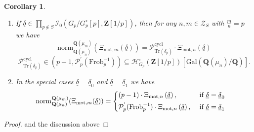 \documentclass{amsart}%
\theoremstyle{plain}
\newtheorem{cor}[thm]{Corollary}
\theoremstyle{plain}
\theoremstyle{remark}
\begin{document}
\begin{cor}\label{cor base change}
\begin{enumerate}
\item If $\underline{\delta}\in\prod_{p\notin S}\mathcal{I}_0(G_p/G_p^\circ[p],\mathbf{Z}[1/p])$, then for any $n,m\in\mathscr{Z}_S$ with $\tfrac{m}{n}=p$ we have
$$
    \mathrm{norm}^{\mathbf{Q}(\mu_m)}_{\mathbf{Q}(\mu_n)}\left(\Xi_{\mathrm{mot},m}(\underline{\delta})\right)=\mathcal{P}_{\mathrm{Tr}(\delta_p)}^\mathrm{cycl}\cdot \Xi_{\mathrm{mot},n}(\underline{\delta})$$
     $$\mathcal{P}_{\mathrm{Tr}(\delta_p)}^\mathrm{cycl}\in \left(p-1,\mathcal{P}_p^{'}\left(\mathrm{Frob}_p^{-1}\right)\right)\subseteq \mathcal{H}_{G_p}^\circ(\mathbf{Z}[1/p])[\mathrm{Gal}(\mathbf{Q}(\mu_n)/\mathbf{Q})].$$
\item In the special cases $\underline{\delta}=\underline{\delta}_0$ and $\underline{\delta}=\underline{\delta}_1$ we have
\begin{align*}
    \mathrm{norm}^{\mathbf{Q}(\mu_m)}_{\mathbf{Q}(\mu_n)}(\Xi_{\mathrm{mot},m}(\underline{\delta}))&=\begin{dcases}
        (p-1)\cdot \Xi_{\mathrm{mot},n}\left(\underline{\delta}\right),\ &\text{if}\ \underline{\delta}=\underline{\delta}_0\\
        \mathcal{P}_p^{'}(\mathrm{Frob}_p^{-1})\cdot \Xi_{\mathrm{mot},n}\left(\underline{\delta}\right),\ &\text{if}\ \underline{\delta}=\underline{\delta}_1
    \end{dcases}
\end{align*} 
\end{enumerate}
\end{cor}
\begin{proof}
     and the discussion above
\end{proof}
\end{document}
